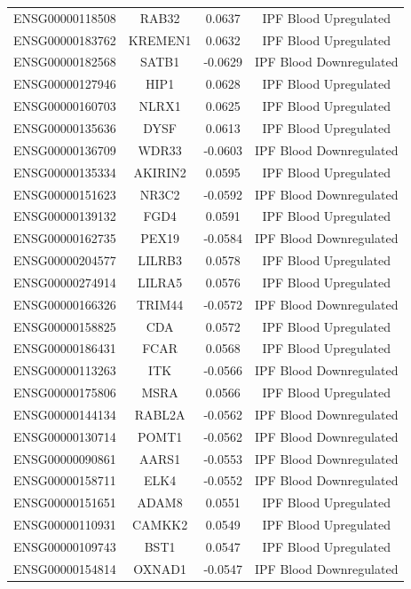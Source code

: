 \documentclass[
]{article}
\begin{document}
\begin{singlespace}
\begin{longtable}[t]{lccc}
ENSG00000118508 & RAB32 & 0.0637 & IPF Blood Upregulated\\
ENSG00000183762 & KREMEN1 & 0.0632 & IPF Blood Upregulated\\
ENSG00000182568 & SATB1 & -0.0629 & IPF Blood Downregulated\\
ENSG00000127946 & HIP1 & 0.0628 & IPF Blood Upregulated\\
\addlinespace
ENSG00000160703 & NLRX1 & 0.0625 & IPF Blood Upregulated\\
ENSG00000135636 & DYSF & 0.0613 & IPF Blood Upregulated\\
ENSG00000136709 & WDR33 & -0.0603 & IPF Blood Downregulated\\
ENSG00000135334 & AKIRIN2 & 0.0595 & IPF Blood Upregulated\\
ENSG00000151623 & NR3C2 & -0.0592 & IPF Blood Downregulated\\
\addlinespace
ENSG00000139132 & FGD4 & 0.0591 & IPF Blood Upregulated\\
ENSG00000162735 & PEX19 & -0.0584 & IPF Blood Downregulated\\
ENSG00000204577 & LILRB3 & 0.0578 & IPF Blood Upregulated\\
ENSG00000274914 & LILRA5 & 0.0576 & IPF Blood Upregulated\\
ENSG00000166326 & TRIM44 & -0.0572 & IPF Blood Downregulated\\
\addlinespace
ENSG00000158825 & CDA & 0.0572 & IPF Blood Upregulated\\
ENSG00000186431 & FCAR & 0.0568 & IPF Blood Upregulated\\
ENSG00000113263 & ITK & -0.0566 & IPF Blood Downregulated\\
ENSG00000175806 & MSRA & 0.0566 & IPF Blood Upregulated\\
ENSG00000144134 & RABL2A & -0.0562 & IPF Blood Downregulated\\
\addlinespace
ENSG00000130714 & POMT1 & -0.0562 & IPF Blood Downregulated\\
ENSG00000090861 & AARS1 & -0.0553 & IPF Blood Downregulated\\
ENSG00000158711 & ELK4 & -0.0552 & IPF Blood Downregulated\\
ENSG00000151651 & ADAM8 & 0.0551 & IPF Blood Upregulated\\
ENSG00000110931 & CAMKK2 & 0.0549 & IPF Blood Upregulated\\
\addlinespace
ENSG00000109743 & BST1 & 0.0547 & IPF Blood Upregulated\\
ENSG00000154814 & OXNAD1 & -0.0547 & IPF Blood Downregulated\\

\end{longtable}
\end{singlespace}
\end{document}
